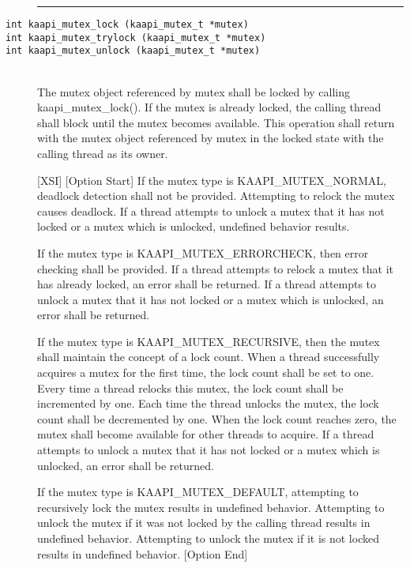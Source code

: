 \begin{description}
\vspace*{3ex} \hrule width 4cm
\vspace*{3ex} 
\item [\texttt{int kaapi\_mutex\_lock (kaapi\_mutex\_t *mutex)}]
\item [\texttt{int kaapi\_mutex\_trylock (kaapi\_mutex\_t *mutex)}]
\item [\texttt{int kaapi\_mutex\_unlock (kaapi\_mutex\_t *mutex)}]~\\

The mutex object referenced by mutex shall be locked by calling
kaapi\_mutex\_lock(). If the mutex is already locked, the calling thread shall
block until the mutex becomes available. This operation shall return with the
mutex object referenced by mutex in the locked state with the calling thread
as its owner.

[XSI] [Option Start] If the mutex type is KAAPI\_MUTEX\_NORMAL, deadlock
detection shall not be provided. Attempting to relock the mutex causes
deadlock. If a thread attempts to unlock a mutex that it has not locked or a
mutex which is unlocked, undefined behavior results.

If the mutex type is KAAPI\_MUTEX\_ERRORCHECK, then error checking shall be
provided. If a thread attempts to relock a mutex that it has already locked,
an error shall be returned. If a thread attempts to unlock a mutex that it has
not locked or a mutex which is unlocked, an error shall be returned.

If the mutex type is KAAPI\_MUTEX\_RECURSIVE, then the mutex shall maintain
the concept of a lock count. When a thread successfully acquires a mutex for
the first time, the lock count shall be set to one. Every time a thread
relocks this mutex, the lock count shall be incremented by one. Each time the
thread unlocks the mutex, the lock count shall be decremented by one. When the
lock count reaches zero, the mutex shall become available for other threads to
acquire. If a thread attempts to unlock a mutex that it has not locked or a
mutex which is unlocked, an error shall be returned.

If the mutex type is KAAPI\_MUTEX\_DEFAULT, attempting to recursively lock the
mutex results in undefined behavior. Attempting to unlock the mutex if it was
not locked by the calling thread results in undefined behavior. Attempting to
unlock the mutex if it is not locked results in undefined behavior. [Option
  End]


\end{description}
